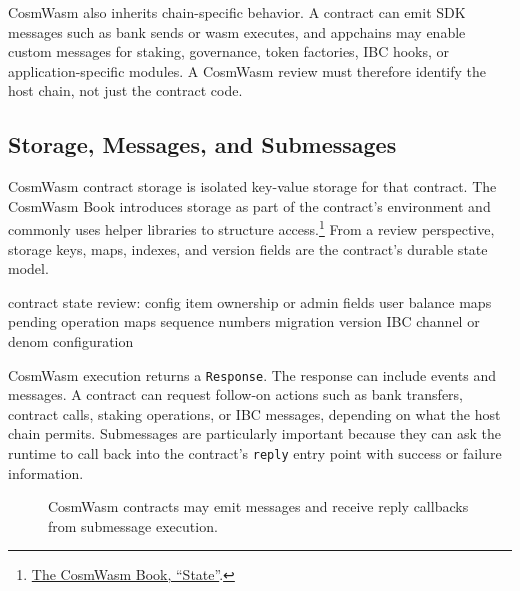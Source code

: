 CosmWasm also inherits chain-specific behavior. A contract can emit SDK messages such as bank sends or wasm executes, and appchains may enable custom messages for staking, governance, token factories, IBC hooks, or application-specific modules. A CosmWasm review must therefore identify the host chain, not just the contract code.

\subsection{Storage, Messages, and Submessages}

CosmWasm contract storage is isolated key-value storage for that contract. The CosmWasm Book introduces storage as part of the contract's environment and commonly uses helper libraries to structure access.\footnote{\href{https://book.cosmwasm.com/basics/state.html}{The CosmWasm Book, ``State''}.} From a review perspective, storage keys, maps, indexes, and version fields are the contract's durable state model.

\begin{codeblock}
contract state review:
    config item
    ownership or admin fields
    user balance maps
    pending operation maps
    sequence numbers
    migration version
    IBC channel or denom configuration
\end{codeblock}

CosmWasm execution returns a \texttt{Response}. The response can include events and messages. A contract can request follow-on actions such as bank transfers, contract calls, staking operations, or IBC messages, depending on what the host chain permits. Submessages are particularly important because they can ask the runtime to call back into the contract's \texttt{reply} entry point with success or failure information.

\begin{figure}[htbp]
\centering
{}
\caption{CosmWasm contracts may emit messages and receive reply callbacks from submessage execution.}
\end{figure}

